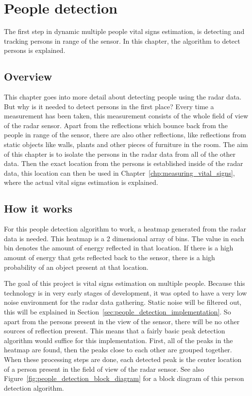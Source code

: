 \chapter{People detection}
\label{chp:people_detection}

The first step in dynamic multiple people vital signs estimation, is detecting and tracking persons in range of the sensor. In this chapter, the algorithm to detect persons is explained.

\section{Overview}
This chapter goes into more detail about detecting people using the radar data. But why is it needed to detect persons in the first place? Every time a measurement has been taken, this measurement consists of the whole field of view of the radar sensor. Apart from the reflections which bounce back from the people in range of the sensor, there are also other reflections, like reflections from static objects like walls, plants and other pieces of furniture in the room. The aim of this chapter is to isolate the persons in the radar data from all of the other data. Then the exact location from the persons is established inside of the radar data, this location can then be used in Chapter~\ref{chp:measuring_vital_signs}, where the actual vital signs estimation is explained.

\section{How it works}
For this people detection algorithm to work, a heatmap generated from the radar data is needed. This heatmap is a 2 dimensional array of bins. The value in each bin denotes the amount of energy reflected in that location. If there is a high amount of energy that gets reflected back to the sensor, there is a high probability of an object present at that location. 

The goal of this project is vital signs estimation on multiple people. Because this technology is in very early stages of development, it was opted to have a very low noise environment for the radar data gathering. Static noise will be filtered out, this will be explained in Section~\ref{sec:people_detection_implementation}. So apart from the persons present in the view of the sensor, there will be no other sources of reflection present. This means that a fairly basic peak detection algorithm would suffice for this implementation. First, all of the peaks in the heatmap are found, then the peaks close to each other are grouped together. When these processing steps are done, each detected peak is the center location of a person present in the field of view of the radar sensor. See also Figure~\ref{fig:people_detection_block_diagram} for a block diagram of this person detection algorithm.

